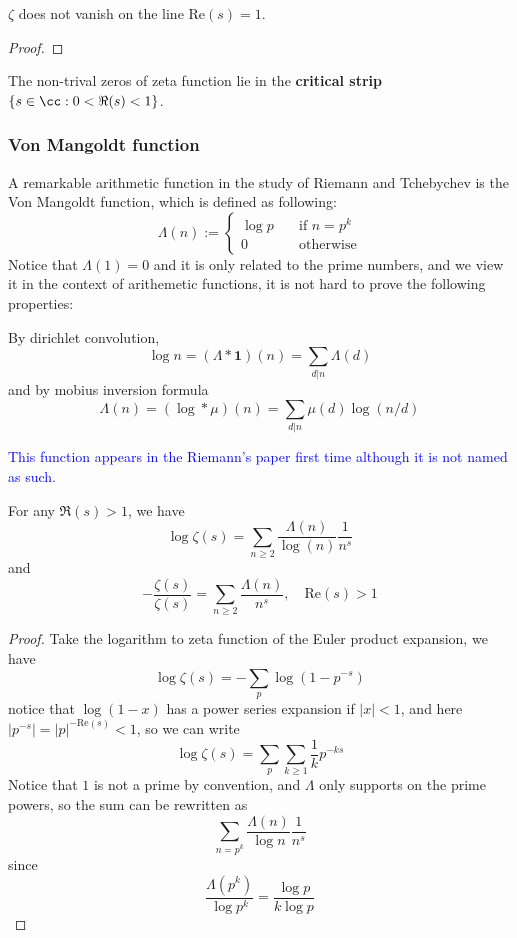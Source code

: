 \begin{colortheorem}[Hamadard,1896]
    \(\zeta\) does not vanish on the line \(\mathrm{Re}(s) = 1\).
\end{colortheorem}

\begin{proof}
    
\end{proof}

\begin{colorcorollary}
    The non-trival zeros of zeta function lie in the \textbf{critical strip} \(\{s \in \cc: 0 < \Re(s) < 1\}\).
\end{colorcorollary}

\subsubsection{Von Mangoldt function}

A remarkable arithmetic function in the study of Riemann and Tchebychev is the Von Mangoldt function, which is defined as following:
\[\Lambda(n) := \begin{cases}
    \log p \quad & \text{if } n = p^k \\
    0 \quad & \text{otherwise}
\end{cases}\]
Notice that \(\Lambda(1) = 0\) and it is only related to the prime numbers, and we view it in the context of arithemetic functions, it is not hard to prove the following properties:

\begin{proposition}
    By dirichlet convolution,
    \[\log n = (\Lambda * \mathbf{1})(n) = \sum_{d|n} \Lambda(d)\]
    and by mobius inversion formula
    \[\Lambda(n) = (\log * \mu)(n) = \sum_{d|n} \mu(d) \log(n/d)\]
\end{proposition}


\textcolor{blue}{This function appears in the Riemann's paper first time although it is not named as such.}



\begin{lemma}[Riemann,1859]
    For any \(\Re(s)>1\), we have
    \[\log \zeta(s) = \sum_{n \geq 2} \frac{\Lambda(n)}{\log(n)} \frac{1}{n^s}\]
    and
    \[-\frac{\zeta(s)}{\zeta(s)} = \sum_{n \geq 2}\frac{\Lambda(n)}{n^s} ,\quad \mathrm{Re}(s) > 1\]
\end{lemma}

\begin{proof}
    Take the logarithm to zeta function of the Euler product expansion, we have
    \[\log \zeta(s) = - \sum_{p} \log(1-p^{-s})\]
    notice that \(\log(1-x)\) has a power series expansion if \(|x|<1\), and here \(|p^{-s}| =|p|^{-\mathrm{Re}(s)} <1\), so we can write
    \[\log \zeta(s) = \sum_{p} \sum_{k\geq 1} \frac{1}{k} p^{-ks}\]
    Notice that \(1\) is not a prime by convention, and \(\Lambda\) only supports on the prime powers, so the sum can be rewritten as 
    \[\sum_{n = p^k} \frac{\Lambda(n)}{\log n}\frac{1}{n^s}\]  
    since
    \[\frac{\Lambda(p^k)}{\log p^k}  = \frac{\log p}{k \log p }\]
\end{proof}

